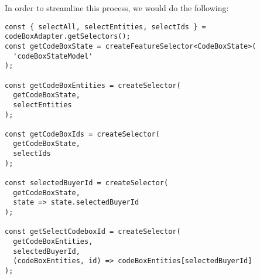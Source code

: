 In order to streamline this process, we would do the following:
\begin{lstlisting}
const { selectAll, selectEntities, selectIds } = codeBoxAdapter.getSelectors();
const getCodeBoxState = createFeatureSelector<CodeBoxState>(
  'codeBoxStateModel'
);

const getCodeBoxEntities = createSelector(
  getCodeBoxState,
  selectEntities
);

const getCodeBoxIds = createSelector(
  getCodeBoxState,
  selectIds
);

const selectedBuyerId = createSelector(
  getCodeBoxState,
  state => state.selectedBuyerId
);

const getSelectCodeboxId = createSelector(
  getCodeBoxEntities,
  selectedBuyerId,
  (codeBoxEntities, id) => codeBoxEntities[selectedBuyerId]
);
\end{lstlisting}

